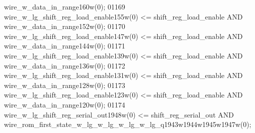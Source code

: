 \begin{DoxyCode}
{{      wire_w_data_in_range160w}\textcolor{vhdlchar}{(}\textcolor{vhdllogic}{}\textcolor{vhdllogic}{0}\textcolor{vhdlchar}{)};
01169     \textcolor{vhdlchar}{wire_w_lg_shift_reg_load_enable155w}\textcolor{vhdlchar}{(}\textcolor{vhdllogic}{}\textcolor{vhdllogic}{0}\textcolor{vhdlchar}{)} \textcolor{vhdlchar}{<=} \textcolor{vhdlchar}{shift_reg_load_enable} \textcolor{keywordflow}{AND} \textcolor{vhdlchar}{
      wire_w_data_in_range152w}\textcolor{vhdlchar}{(}\textcolor{vhdllogic}{}\textcolor{vhdllogic}{0}\textcolor{vhdlchar}{)};
01170     \textcolor{vhdlchar}{wire_w_lg_shift_reg_load_enable147w}\textcolor{vhdlchar}{(}\textcolor{vhdllogic}{}\textcolor{vhdllogic}{0}\textcolor{vhdlchar}{)} \textcolor{vhdlchar}{<=} \textcolor{vhdlchar}{shift_reg_load_enable} \textcolor{keywordflow}{AND} \textcolor{vhdlchar}{
      wire_w_data_in_range144w}\textcolor{vhdlchar}{(}\textcolor{vhdllogic}{}\textcolor{vhdllogic}{0}\textcolor{vhdlchar}{)};
01171     \textcolor{vhdlchar}{wire_w_lg_shift_reg_load_enable139w}\textcolor{vhdlchar}{(}\textcolor{vhdllogic}{}\textcolor{vhdllogic}{0}\textcolor{vhdlchar}{)} \textcolor{vhdlchar}{<=} \textcolor{vhdlchar}{shift_reg_load_enable} \textcolor{keywordflow}{AND} \textcolor{vhdlchar}{
      wire_w_data_in_range136w}\textcolor{vhdlchar}{(}\textcolor{vhdllogic}{}\textcolor{vhdllogic}{0}\textcolor{vhdlchar}{)};
01172     \textcolor{vhdlchar}{wire_w_lg_shift_reg_load_enable131w}\textcolor{vhdlchar}{(}\textcolor{vhdllogic}{}\textcolor{vhdllogic}{0}\textcolor{vhdlchar}{)} \textcolor{vhdlchar}{<=} \textcolor{vhdlchar}{shift_reg_load_enable} \textcolor{keywordflow}{AND} \textcolor{vhdlchar}{
      wire_w_data_in_range128w}\textcolor{vhdlchar}{(}\textcolor{vhdllogic}{}\textcolor{vhdllogic}{0}\textcolor{vhdlchar}{)};
01173     \textcolor{vhdlchar}{wire_w_lg_shift_reg_load_enable123w}\textcolor{vhdlchar}{(}\textcolor{vhdllogic}{}\textcolor{vhdllogic}{0}\textcolor{vhdlchar}{)} \textcolor{vhdlchar}{<=} \textcolor{vhdlchar}{shift_reg_load_enable} \textcolor{keywordflow}{AND} \textcolor{vhdlchar}{
      wire_w_data_in_range120w}\textcolor{vhdlchar}{(}\textcolor{vhdllogic}{}\textcolor{vhdllogic}{0}\textcolor{vhdlchar}{)};
01174     \textcolor{vhdlchar}{wire_w_lg_shift_reg_serial_out1948w}\textcolor{vhdlchar}{(}\textcolor{vhdllogic}{}\textcolor{vhdllogic}{0}\textcolor{vhdlchar}{)} \textcolor{vhdlchar}{<=} \textcolor{vhdlchar}{shift_reg_serial_out} \textcolor{keywordflow}{AND} \textcolor{vhdlchar}{
      wire_rom_first_state_w_lg_w_lg_w_lg_w_lg_q1943w1944w1945w1947w}\textcolor{vhdlchar}{(}\textcolor{vhdllogic}{}\textcolor{vhdllogic}{0}\textcolor{vhdlchar}{)};
}
\end{DoxyCode}

